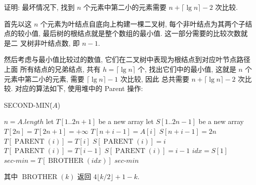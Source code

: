 \documentclass[boxes]{homework}
\begin{document}

\begin{problem}
证明: 最坏情况下, 找到 $n$ 个元素中第二小的元素需要 $n + \lceil \lg n \rceil -2$
次比较.
\end{problem}
\begin{solution}
    首先以这 $n$ 个元素为叶结点自底向上构建一棵二叉树, 每个非叶结点为其两个子结
    点的较小值, 最后树的根结点就是整个数组的最小值. 这一部分需要的比较次数就是二
    叉树非叶结点数, 即 $n - 1$.

    然后考虑与最小值比较过的数值, 它们在二叉树中表现为根结点到对应叶节点路径上面
    所有结点的兄弟结点, 共有 $h = \lceil \lg n \rceil$ 个, 找出它们中的最小值,
    这就是 $n$ 个元素中第二小的元素, 需要 $\lceil \lg n\rceil - 1$ 次比较, 因此
    总共需要 $n + \lceil\lg n\rceil - 2$ 次比较. 对应的算法如下, 使用堆中的
    {\sc Parent} 操作:

    \begin{algo}
        \caption{SECOND-MIN\.($A$)}
        \label{algo:9.1-1}
        $n = A.length$\;
        let $T[1..2n+1]$ be a new array\;
        let $S[1..2n-1]$ be a new array\;
        $T[2n] = T[2n+1]= +\infty$\;
         {
            $T[n + i - 1] = A[i]$\;
            $S[n + i - 1] = 2n$ 
        }
         {
             {
                $T[\operatorname{PARENT}(i)] = T[i]$\;
                $S[\operatorname{PARENT}(i)] = i$\;
            }{
                $T[\operatorname{PARENT}(i)] = T[i - 1]$\;
                $S[\operatorname{PARENT}(i)] = i - 1$\;
            }
        }
        $idx = S[1]$\;
        $sec\text{-}min = T[\operatorname{BROTHER}(idx)]$\;
        \Return $sec\text{-}min$\;
    \end{algo}
    其中 $\operatorname{BROTHER}(k)$ 返回 $4\lfloor k / 2\rfloor + 1 - k$.
\end{solution}

\end{document}
